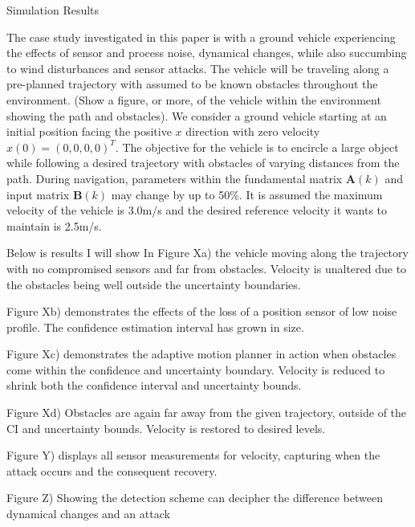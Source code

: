 
\begin{section}{Simulation Results}
\label{sec:simulation}


The case study investigated in this paper is with a ground vehicle experiencing the effects of sensor and process noise, dynamical changes, while also succumbing to wind disturbances and sensor attacks. The vehicle will be traveling along a pre-planned trajectory with assumed to be known obstacles throughout the environment. (Show a figure, or more, of the vehicle within the environment showing the path and obstacles). We consider a ground vehicle starting at an initial position facing the positive $x$ direction with zero velocity $x(0)=(0,0,0,0)^T$. The objective for the vehicle is to encircle a large object while following a desired trajectory with obstacles of varying distances from the path. During navigation, parameters within the fundamental matrix $\bm{A}(k)$ and input matrix $\bm{B}(k)$ may change by up to 50\%. It is assumed the maximum velocity of the vehicle is 3.0m/s and the desired reference velocity it wants to maintain is 2.5m/s. 


Below is results I will show 
In Figure Xa) the vehicle moving along the trajectory with no compromised sensors and far from obstacles. Velocity is unaltered due to the obstacles being well outside the uncertainty boundaries.

Figure Xb) demonstrates the effects of the loss of a position sensor of low noise profile. The confidence estimation interval has grown in size.

Figure Xc) demonstrates the adaptive motion planner in action when obstacles come within the confidence and uncertainty boundary. Velocity is reduced to shrink both the confidence interval and uncertainty bounds.

Figure Xd) Obstacles are again far away from the given trajectory, outside of the CI and uncertainty bounds. Velocity is restored to desired levels.

Figure Y) displays all sensor measurements for velocity, capturing when the attack occurs and the consequent recovery. 

Figure Z) Showing the detection scheme can decipher the difference between dynamical changes and an attack



\end{section}
